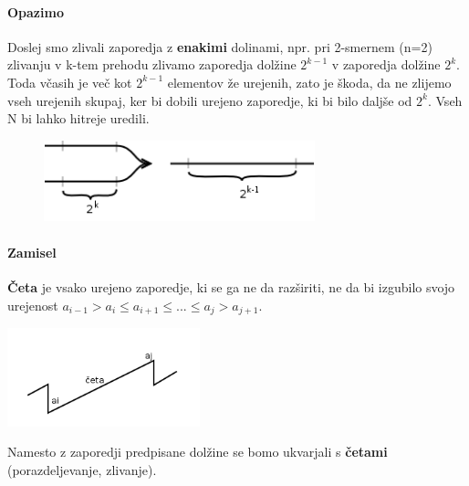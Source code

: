 \documentclass[a4paper,10pt]{article}
\begin{document}
\paragraph{Opazimo}
Doslej smo zlivali zaporedja z \textbf{enakimi} dolinami, npr. pri 2-smernem (n=2) zlivanju v k-tem prehodu zlivamo zaporedja dol\v zine $2^{k-1}$ v zaporedja dol\v zine $2^k$.\\
Toda v\v casih je ve\v c kot $2^{k-1}$ elementov \v ze urejenih, zato je \v skoda, da ne zlijemo vseh urejenih skupaj, ker bi dobili urejeno zaporedje, ki bi bilo dalj\v se od $2^k$. Vseh N bi lahko hitreje uredili.
\begin{figure}[hbt]
	\begin{center}
	\includegraphics[width=7.85cm,height=2.35cm]{Slike/NaravnoZlivanje1}
	\end{center}
\end{figure}

\paragraph{Zamisel}
\textbf{\v Ceta} je vsako urejeno zaporedje, ki se ga ne da raz\v siriti, ne da bi izgubilo svojo urejenost $a_{i-1} > a_i \leq a_{i+1} \leq ... \leq a_j > a_{j+1}$.\\
\begin{center}
	\includegraphics[width=5.6cm,height=2.85cm]{Slike/NaravnoZlivanjeCeta.png}
\end{center}
Namesto z zaporedji predpisane dol\v zine se bomo ukvarjali s \textbf{\v cetami} (porazdeljevanje, zlivanje).
\end{document}
